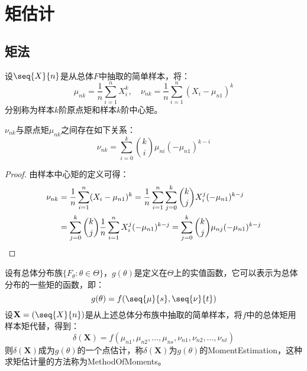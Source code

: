 \section{矩估计}

\subsection{矩法}
\begin{definition}
	设$\seq{X}{n}$是从总体$F$中抽取的简单样本，将：
	\begin{equation*}
		\mu_{nk}=\frac{1}{n}\sum_{i=1}^{n}X_i^k,\quad
		\nu_{nk}=\frac{1}{n}\sum_{i=1}^{n}(X_i-\mu_{n1})^k
	\end{equation*}
	分别称为样本$k$阶原点矩和样本$k$阶中心矩。
\end{definition}
\begin{theorem}\label{theo:SampleMoment}
	$\nu_{nk}$与原点矩$\mu_{nk}$之间存在如下关系：
	\begin{equation*}
		\nu_{nk}=\sum_{i=0}^{k}\binom{k}{i}\mu_{ni}(-\mu_{n1})^{k-i}
	\end{equation*}
\end{theorem}
\begin{proof}
	由样本中心矩的定义可得：
	\begin{align*}
		\nu_{nk}
		&=\frac{1}{n}\sum_{i=1}^{n}(X_i-\mu_{n1})^k
		=\frac{1}{n}\sum_{i=1}^{n}\sum_{j=0}^{k}\binom{k}{j}X_i^j(-\mu_{n1})^{k-j} \\
		&=\sum_{j=0}^{k}\binom{k}{j}\frac{1}{n}\sum_{i=1}^{n}X_i^j(-\mu_{n1})^{k-j}
		=\sum_{j=0}^{k}\binom{k}{j}\mu_{nj}(-\mu_{n1})^{k-j}\qedhere
	\end{align*}
\end{proof}
\begin{definition}
	设有总体分布族$\{F_\theta:\theta\in\Theta\}$，$g(\theta)$是定义在$\Theta$上的实值函数，它可以表示为总体分布的一些矩的函数，即：
	\begin{equation*}
		g(\theta)=f(\seq{\mu}{s},\seq{\nu}{t})
	\end{equation*}
	设$\mathbf{X}=(\seq{X}{n})$是从上述总体分布族中抽取的简单样本，将$f$中的总体矩用样本矩代替，得到：
	\begin{equation*}
		\delta(\mathbf{X})=f(\mu_{n1},\mu_{n2},\dots,\mu_{ns},\nu_{n1},\nu_{n2},\dots,\nu_{nt})
	\end{equation*}
	则$\delta(\mathbf{X})$成为$g(\theta)$的一个点估计，称$\delta(\mathbf{X})$为$g(\theta)$的\gls{MomentEstimation}，这种求矩估计量的方法称为\gls{MethodOfMoments}。
\end{definition}

